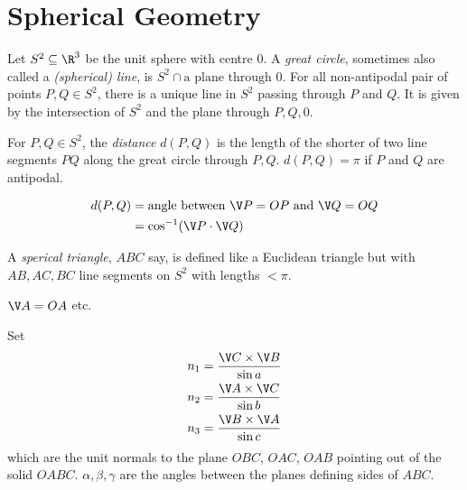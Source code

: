 \documentclass[a4paper]{article}
\theoremstyle{definition}
\begin{document}
\section{Spherical Geometry}

\begin{notation}
  Let \(S^2 \subseteq \R^3\) be the unit sphere with centre \(0\). A \emph{great circle}, sometimes also called a \emph{(spherical) line}, is \(S^2 \cap \text{a plane through } 0\). For all non-antipodal pair of points \(P, Q \in S^2\), there is a unique line in \(S^2\) passing through \(P\) and \(Q\). It is given by the intersection of \(S^2\) and the plane through \(P, Q, 0\).
\end{notation}

\begin{definition}
  For \(P, Q \in S^2\), the \emph{distance} \(d(P, Q)\) is the length of the shorter of two line segments \(PQ\) along the great circle through \(P, Q\). \(d(P, Q) = \pi\) if \(P\) and \(Q\) are antipodal.
\end{definition}

\begin{note}
  \begin{align*}
    d(P, Q) &= \text{angle between } \V P = OP \text{ and } \V Q = OQ \\
            &= \cos^{-1} (\V P \cdot \V Q)
  \end{align*}
\end{note}

\begin{definition}
  A \emph{sperical triangle}, \(ABC\) say, is defined like a Euclidean triangle but with \(AB, AC, BC\) line segments on \(S^2\) with lengths \(< \pi\).
\end{definition}

\begin{notation}
  \(\V A = OA\) etc.
\end{notation}

Set
\begin{align*}
  n_1 &= \frac{\V C \times \V B}{\sin a} \\
  n_2 &= \frac{\V A \times \V C}{\sin b} \\
  n_3 &= \frac{\V B \times \V A}{\sin c}
\end{align*}
which are the unit normals to the plane \(OBC\), \(OAC\), \(OAB\) pointing out of the solid \(OABC\). \(\alpha, \beta, \gamma\) are the angles between the planes defining sides of \(ABC\).
\end{document}
